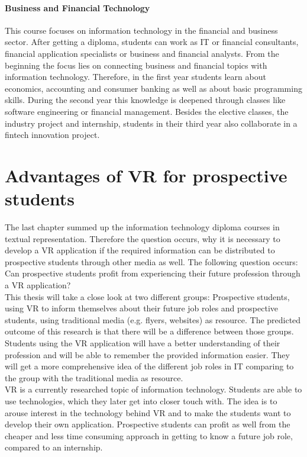 \paragraph{Business and Financial Technology}
This course focuses on information technology in the financial and business sector. After getting a diploma, students can work as IT or financial consultants, financial application specialists or business and financial analysts. From the beginning the focus lies on connecting business and financial topics with information technology. Therefore, in the first year students learn about economics, accounting and consumer banking as well as about basic programming skills. During the second year this knowledge is deepened through classes like software engineering or financial management. Besides the elective classes, the industry project and internship, students in their third year also collaborate in a fintech innovation project.

\section{Advantages of VR for prospective students}
The last chapter summed up the information technology diploma courses in textual representation. Therefore the question occurs, why it is necessary to develop a VR application if the required information can be distributed to prospective students through other media as well. The following question occurs: Can prospective students profit from experiencing their future profession through a VR application? \\
This thesis will take a close look at two different groups: Prospective students, using VR to inform themselves about their future job roles and prospective students, using traditional media (e.g. flyers, websites) as resource.
The predicted outcome of this research is that there will be a difference between those groups. Students using the VR application will have a better understanding of their profession and will be able to remember the provided information easier. They will get a more comprehensive idea of the different job roles in IT  comparing to the group with the traditional media as resource. \\

VR is a currently researched topic of information technology. Students are able to use technologies, which they later get into closer touch with. The idea is to arouse interest in the technology behind VR and to make the students want to develop their own application. Prospective students can profit as well from the cheaper and less time consuming approach in getting to know a future job role, compared to an internship. 
